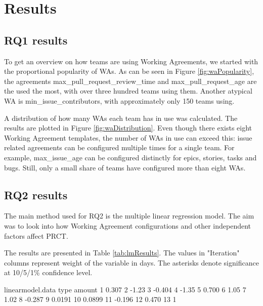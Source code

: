 
\chapter{Results}

\section{RQ1 results}

To get an overview on how teams are using Working Agreements, we started with the proportional popularity of WAs. As can be seen in Figure \ref{fig:waPopularity}, the agreements max\_pull\_request\_review\_time and max\_pull\_request\_age are the used the most, with over three hundred teams using them. Another atypical WA is min\_issue\_contributors, with approximately only 150 teams using.



A distribution of how many WAs each team has in use was calculated. The results are plotted in Figure \ref{fig:waDistribution}. Even though there exists eight Working Agreement templates, the number of WAs in use can exceed this: issue related agreements can be configured multiple times for a single team. For example, max\_issue\_age can be configured distinctly for epics, stories, tasks and bugs. Still, only a small share of teams have configured more than eight WAs.





\section{RQ2 results}

The main method used for RQ2 is the multiple linear regression model. The aim was to look into how Working Agreement configurations and other independent factors affect PRCT. 

The results are presented in Table \ref{tab:lmResults}. The values in "Iteration" columns represent weight of the variable in days. The asterisks denote significance at 10/5/1\% confidence level.



\begin{filecontents}{linearmodel.data}
type    amount
1       0.307
2       -1.23
3       -0.404
4       -1.35
5       0.700
6       1.05
7       1.02
8       -0.287
9       0.0191
10      0.0899
11      -0.196
12      0.470
13      1
\end{filecontents}

